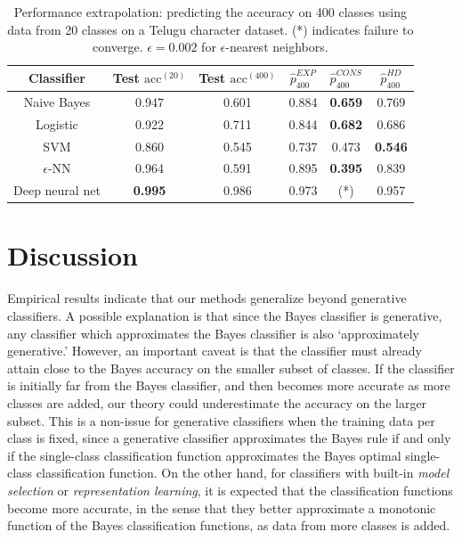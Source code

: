 \documentclass[12pt]{article}
\begin{document}
\begin{table}
\centering
\begin{tabular}{|c||c|c|c|c|c|}\hline
Classifier & Test $\text{acc}^{(20)}$ & Test $\text{acc}^{(400)}$ & $\hat{p}^{EXP}_{400}$ & $\hat{p}^{CONS}_{400}$ & $\hat{p}^{HD}_{400}$\\ \hline
Naive Bayes & 0.947 & 0.601 & 0.884 & \textbf{0.659} & 0.769 \\ \hline
Logistic & 0.922 & 0.711 & 0.844 & \textbf{0.682} & 0.686 \\ \hline
SVM & 0.860 & 0.545 & 0.737 & 0.473 & \textbf{0.546} \\ \hline
$\epsilon$-NN & 0.964 & 0.591 & 0.895 & \textbf{0.395} & 0.839\\ \hline
Deep neural net & \textbf{0.995} & 0.986 & 0.973 & (*) & 0.957\\ \hline
\end{tabular}
\caption{Performance extrapolation: predicting the accuracy on 400 classes using data from 20 classes on a Telugu character dataset. (*) indicates failure to converge.
$\epsilon = 0.002$ for $\epsilon$-nearest neighbors.}
\end{table}

\section{Discussion}

Empirical results indicate that our methods generalize beyond generative classifiers.
A possible explanation is that since the Bayes classifier is generative,
any classifier which approximates the Bayes classifier is also `approximately generative.'
However, an important caveat is that the classifier must already attain close to the Bayes accuracy
on the smaller subset of classes.  If the classifier is initially far from the Bayes classifier,
and then becomes more accurate as more classes are added, our theory could underestimate the
accuracy on the larger subset.  This is a non-issue for generative classifiers when the training data per class is fixed,
since a generative classifier approximates the Bayes rule if and only if the single-class classification function approximates the
Bayes optimal single-class classification function.  On the other hand, for classifiers with built-in \emph{model selection}
or \emph{representation learning}, it is expected that the classification functions become more accurate,
in the sense that they better approximate a monotonic function of the Bayes classification functions,
as data from more classes is added.
\end{document}
